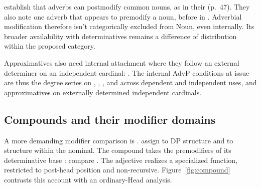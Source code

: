 \documentclass[12pt]{article}
\begin{document}
\textcite[42--47]{payne2010} establish that adverbs can postmodify common nouns, as in their  (p.~47). They also note one adverb that appears to premodify a noun,  before  in  \citep[p.~75, n.~3]{payne2010}. Adverbial modification therefore isn't categorically excluded from Noun, even internally. Its broader availability with determinatives remains a difference of distribution within the proposed category.

Approximatives also need internal attachment where they follow an external determiner on an independent cardinal: . The internal AdvP conditions at issue are thus the degree series on , , , and  across dependent and independent uses, and approximatives on externally determined independent cardinals.

\subsection{Compounds and their modifier domains}\label{sec:compounds}

A more demanding modifier comparison is . \textcite[581--583]{Payne2007} assign  to DP structure and  to structure within the nominal. The compound  takes the premodifiers of its determinative base : compare . The adjective realizes a specialized  function, restricted to post-head position and non-recursive. Figure~\ref{fig:compound} contrasts this account with an ordinary-Head analysis.
\end{document}
